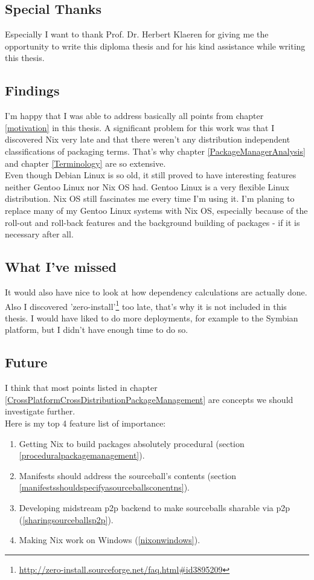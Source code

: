 \documentclass[a4paper,10pt]{article}
\begin{document}
\subsection*{Special Thanks}
Especially I want to thank Prof. Dr. Herbert Klaeren for giving me the opportunity to write this diploma thesis and for his kind assistance while writing this thesis.

\subsection*{Findings}
I'm happy that I was able to address basically all points from chapter \ref{motivation} in this thesis. A significant problem for this work was that I discovered Nix very late and that there weren't any distribution independent classifications of packaging terms. That's why chapter \ref{PackageManagerAnalysis} and chapter \ref{Terminology} are so extensive.\\

Even though Debian Linux is so old, it still proved to have interesting features neither Gentoo Linux nor Nix OS had. Gentoo Linux is a very flexible Linux distribution. Nix OS still fascinates me every time I'm using it. I'm planing to replace many of my Gentoo Linux systems with Nix OS, especially because of the roll-out and roll-back features and the background building of packages - if it is necessary after all.

\subsection*{What I've missed}
It would also have nice to look at how dependency calculations are actually done. Also I discovered 'zero-install'\footnote{\url{http://zero-install.sourceforge.net/faq.html\#id3895209}} too late, that's why it is not included in this thesis. I would have liked to do more deployments, for example to the Symbian platform, but I didn't have enough time to do so.

\subsection*{Future}
I think that most points listed in chapter \ref{CrossPlatformCrossDistributionPackageManagement} are concepts we should investigate further.\\

Here is my top 4 feature list of importance:
\begin{enumerate}
\item Getting Nix to build packages absolutely procedural (section \ref{proceduralpackagemanagement}).
\item Manifests should address the sourceball's contents (section \ref{manifestsshouldspecifyasourceballsconentns}).
\item Developing midstream p2p backend to make sourceballs sharable via p2p (\ref{sharingsourceballsp2p}).
\item Making Nix work on Windows (\ref{nixonwindows}).
\end{enumerate}
\end{document}
